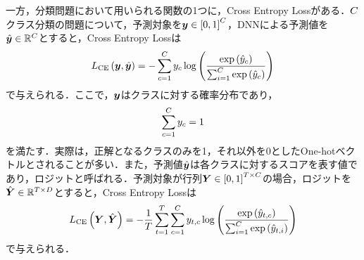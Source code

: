 一方，分類問題において用いられる関数の1つに，Cross Entropy Lossがある．$C$クラス分類の問題について，予測対象を$\bm{y} \in \left[0, 1\right]^{C}$，DNNによる予測値を$\hat{\bm{y}} \in \mathbb{R}^{C}$とすると，Cross Entropy Lossは
\begin{equation}
    L_{\text{CE}}\left(\bm{y}, \hat{\bm{y}}\right) = - \sum_{c = 1}^{C} y_{c} \log \left(\frac{\exp\left(\hat{y}_{c}\right)}{\sum_{i = 1}^{C} \exp\left(\hat{y}_{c}\right)}\right)
\end{equation}
で与えられる．ここで，$\bm{y}$はクラスに対する確率分布であり，
\begin{equation}
    \sum_{c = 1}^{C} y_{c} = 1
\end{equation}
を満たす．実際は，正解となるクラスのみを1，それ以外を0としたOne-hotベクトルとされることが多い．また，予測値$\hat{\bm{y}}$は各クラスに対するスコアを表す値であり，ロジットと呼ばれる．予測対象が行列$\bm{Y} \in \left[0, 1\right]^{T \times C}$の場合，ロジットを$\hat{\bm{Y}} \in \mathbb{R}^{T \times D}$とすると，Cross Entropy Lossは
\begin{equation}
    L_{\text{CE}}\left(\bm{Y}, \hat{\bm{Y}}\right) = - \frac{1}{T} \sum_{t = 1}^{T} \sum_{c = 1}^{C} y_{t, c} \log \left(\frac{\exp\left(\hat{y}_{t, c}\right)}{\sum_{i = 1}^{C} \exp\left(\hat{y}_{t, i}\right)}\right)
\end{equation}
で与えられる．

